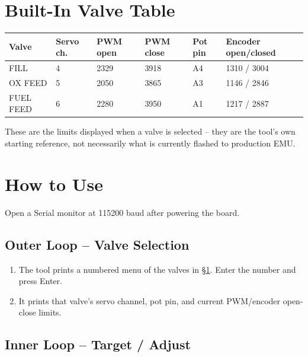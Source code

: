 \documentclass[11pt,letterpaper]{article}
\begin{document}
\section{Built-In Valve Table}
\label{sec:valve-table}

\begin{center}
\begin{tabularx}{\textwidth}{@{}lllllY@{}}
\toprule
Valve & Servo ch. & PWM open & PWM close & Pot pin & Encoder open/closed \\
\midrule
FILL      & 4 & 2329 & 3918 & A4 & 1310 / 3004 \\
OX FEED   & 5 & 2050 & 3865 & A3 & 1146 / 2846 \\
FUEL FEED & 6 & 2280 & 3950 & A1 & 1217 / 2887 \\
\bottomrule
\end{tabularx}
\end{center}

These are the limits displayed when a valve is selected -- they are the
tool's own starting reference, not necessarily what is currently flashed
to production EMU.

\section{How to Use}

Open a Serial monitor at 115200 baud after powering the board.

\subsection{Outer Loop -- Valve Selection}

\begin{enumerate}[nosep]
  \item The tool prints a numbered menu of the valves in
        §\ref{sec:valve-table}. Enter the number and press Enter.
  \item It prints that valve's servo channel, pot pin, and current
        PWM/encoder open-close limits.
\end{enumerate}

\subsection{Inner Loop -- Target / Adjust}
\end{document}
